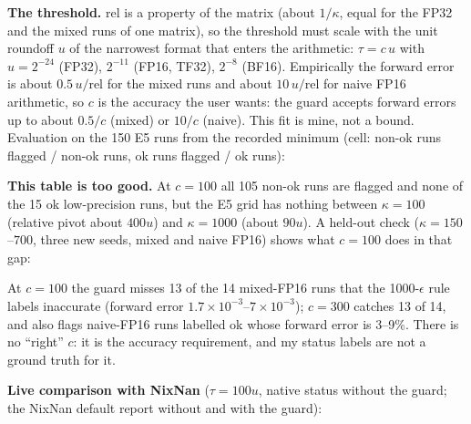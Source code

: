 \documentclass[11pt,a4paper]{article}
\begin{document}
\textbf{The threshold.} $\mathrm{rel}$ is a property of the matrix (about $1/\kappa$, equal for the FP32 and the mixed runs of one matrix), so the threshold must scale with the unit roundoff $u$ of the narrowest format that enters the arithmetic: $\tau=c\,u$ with $u=2^{-24}$ (FP32), $2^{-11}$ (FP16, TF32), $2^{-8}$ (BF16).
Empirically the forward error is about $0.5\,u/\mathrm{rel}$ for the mixed runs and about $10\,u/\mathrm{rel}$ for naive FP16 arithmetic, so $c$ is the accuracy the user wants: the guard accepts forward errors up to about $0.5/c$ (mixed) or $10/c$ (naive). This fit is mine, not a bound.
Evaluation on the 150 E5 runs from the recorded minimum (cell: non-ok runs flagged / non-ok runs, ok runs flagged / ok runs):

\begin{center}\scriptsize\end{center}

\textbf{This table is too good.} At $c=100$ all 105 non-ok runs are flagged and none of the 15 ok low-precision runs, but the E5 grid has nothing between $\kappa=100$ (relative pivot about $400u$) and $\kappa=1000$ (about $90u$). A held-out check ($\kappa=150$--$700$, three new seeds, mixed and naive FP16) shows what $c=100$ does in that gap:

\begin{center}\scriptsize\end{center}

At $c=100$ the guard misses 13 of the 14 mixed-FP16 runs that the 1000-$\epsilon$ rule labels inaccurate (forward error $1.7\times10^{-3}$--$7\times10^{-3}$); $c=300$ catches 13 of 14, and also flags naive-FP16 runs labelled ok whose forward error is 3--9\%. There is no ``right'' $c$: it is the accuracy requirement, and my status labels are not a ground truth for it.

\textbf{Live comparison with NixNan} ($\tau=100u$, native status without the guard; the NixNan default report without and with the guard):

\begin{center}\scriptsize\end{center}
\end{document}
